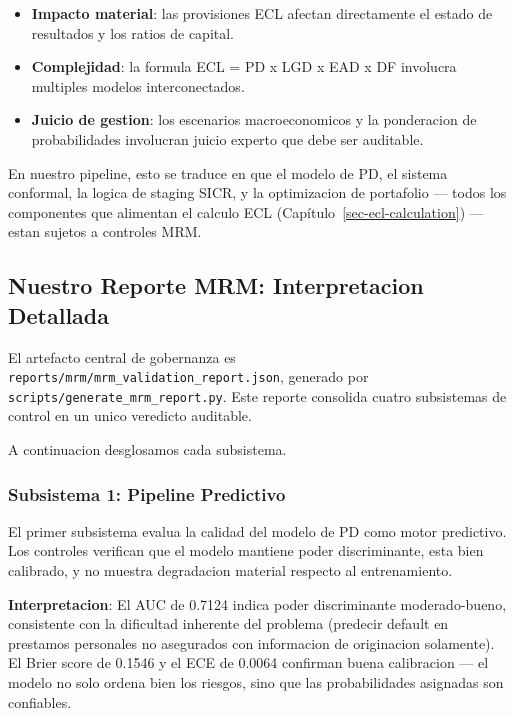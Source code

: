 \documentclass[
  spanish,
  11pt,
  letterpaper,
]{scrbook}
\providecommand{\tightlist}{%
  \setlength{\itemsep}{0pt}\setlength{\parskip}{0pt}}
\theoremstyle{plain}
\theoremstyle{remark}
\begin{document}
\begin{itemize}
\tightlist
\item
  \textbf{Impacto material}: las provisiones ECL afectan directamente el
  estado de resultados y los ratios de capital.
\item
  \textbf{Complejidad}: la formula ECL = PD x LGD x EAD x DF involucra
  multiples modelos interconectados.
\item
  \textbf{Juicio de gestion}: los escenarios macroeconomicos y la
  ponderacion de probabilidades involucran juicio experto que debe ser
  auditable.
\end{itemize}

En nuestro pipeline, esto se traduce en que el modelo de PD, el sistema
conformal, la logica de staging SICR, y la optimizacion de portafolio
--- todos los componentes que alimentan el calculo ECL
(Capítulo~\ref{sec-ecl-calculation}) --- estan sujetos a controles MRM.

\subsection{Nuestro Reporte MRM: Interpretacion
Detallada}\label{sec-mrm-report-detail}

El artefacto central de gobernanza es
\texttt{reports/mrm/mrm\_validation\_report.json}, generado por
\texttt{scripts/generate\_mrm\_report.py}. Este reporte consolida cuatro
subsistemas de control en un unico veredicto auditable.

A continuacion desglosamos cada subsistema.

\subsubsection{Subsistema 1: Pipeline
Predictivo}\label{sec-mrm-pipeline-subsystem}

El primer subsistema evalua la calidad del modelo de PD como motor
predictivo. Los controles verifican que el modelo mantiene poder
discriminante, esta bien calibrado, y no muestra degradacion material
respecto al entrenamiento.

\textbf{Interpretacion}: El AUC de 0.7124 indica poder discriminante
moderado-bueno, consistente con la dificultad inherente del problema
(predecir default en prestamos personales no asegurados con informacion
de originacion solamente). El Brier score de 0.1546 y el ECE de 0.0064
confirman buena calibracion --- el modelo no solo ordena bien los
riesgos, sino que las probabilidades asignadas son confiables.
\end{document}

